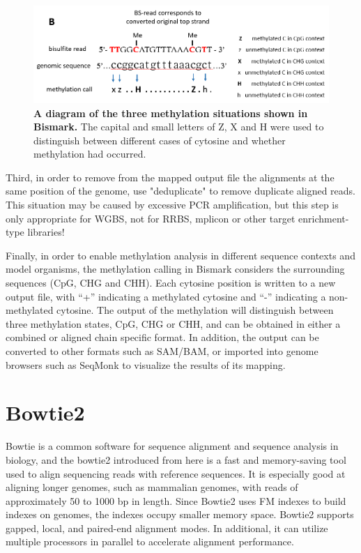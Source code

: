 \documentclass{PHlab-thesis}
\begin{document}
\begin{figure}[h!]
  \centering
  \includegraphics[scale=0.8]{figures/bismark-b.png}
  \caption{\textbf{A diagram of the three methylation situations shown in Bismark.}
  The capital and small letters of Z, X and H were used to distinguish between different cases of cytosine and whether methylation had occurred.}
  \label{f4}
\end{figure}


\par
Third, in order to remove from the mapped output file the alignments at the same position of the genome, use "deduplicate" to remove duplicate aligned reads. This situation may be caused by excessive PCR amplification, but this step is only appropriate for WGBS, not for RRBS, mplicon or other target enrichment-type libraries!

\par
Finally, in order to enable methylation analysis in different sequence contexts and model organisms, the methylation calling in Bismark considers the surrounding sequences (CpG, CHG and CHH). Each cytosine position is written to a new output file, with “+” indicating a methylated cytosine and “-” indicating a non-methylated cytosine. The output of the methylation will distinguish between three methylation states, CpG, CHG or CHH, and can be obtained in either a combined or aligned chain specific format. In addition, the output can be converted to other formats such as SAM/BAM, or imported into genome browsers such as SeqMonk to visualize the results of its mapping.

\section{Bowtie2}
Bowtie is a common software for sequence alignment and sequence analysis in biology, and the bowtie2 introduced from here is a fast and memory-saving tool used to align sequencing reads with reference sequences. It is especially good at aligning longer genomes, such as mammalian genomes, with reads of approximately 50 to 1000 bp in length. Since Bowtie2 uses FM indexes to build indexes on genomes, the indexes occupy smaller memory space. Bowtie2 supports gapped, local, and paired-end alignment modes. In additional, it can utilize multiple processors in parallel to accelerate alignment performance.
\end{document}
